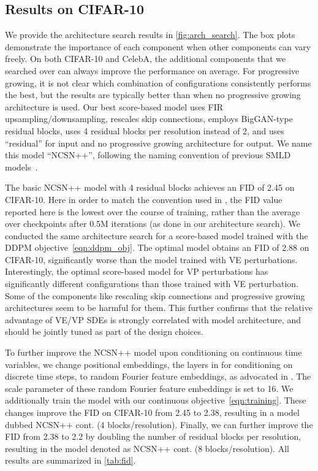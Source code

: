 \subsection{Results on CIFAR-10}\label{app:rescifar10} We provide the architecture search results in \cref{fig:arch_search}. The box plots demonstrate the importance of each component when other components can vary freely. On both CIFAR-10 and CelebA, the additional components that we searched over can always improve the performance on average. For progressive growing, it is not clear which combination of configurations consistently performs the best, but the results are typically better than when no progressive growing architecture is used. Our best score-based model uses FIR upsampling/downsampling, rescales skip connections, employs BigGAN-type residual blocks, uses 4 residual blocks per resolution instead of 2, and uses ``residual'' for input and no progressive growing architecture for output. We name this model ``NCSN++'', following the naming convention of previous SMLD models~\citep{song2019generative,song2020improved}. 

The basic NCSN++ model with 4 residual blocks achieves an FID of 2.45 on CIFAR-10. Here in order to match the convention used in \citet{karras2018progressive,song2019generative,ho2020denoising}, the FID value reported here is the lowest over the course of training, rather than the average over checkpoints after 0.5M iterations (as done in our architecture search). We conducted the same architecture search for a score-based model trained with the DDPM objective~\cref{eqn:ddpm_obj}. The optimal model obtains an FID of 2.88 on CIFAR-10, significantly worse than the model trained with VE perturbations. Interestingly, the optimal score-based model for VP perturbations has significantly different configurations than those trained with VE perturbation. Some of the components like rescaling skip connections and progressive growing architectures seem to be harmful for them. This further confirms that the relative advantage of VE/VP SDEs is strongly correlated with model architecture, and should be jointly tuned as part of the design choices.

To further improve the NCSN++ model upon conditioning on continuous time variables, we change positional embeddings, the layers in \citet{ho2020denoising} for conditioning on discrete time steps, to random Fourier feature embeddings, as advocated in \citet{tancik2020fourfeat}. The scale parameter of these random Fourier feature embeddings is set to 16. We additionally train the model with our continuous objective~\cref{eqn:training}. These changes improve the FID on CIFAR-10 from 2.45 to 2.38, resulting in a model dubbed NCSN++ cont. (4 blocks/resolution). Finally, we can further improve the FID from 2.38 to 2.2 by doubling the number of residual blocks per resolution, resulting in the model denoted as NCSN++ cont. (8 blocks/resolution). All results are summarized in \cref{tab:fid}. 


